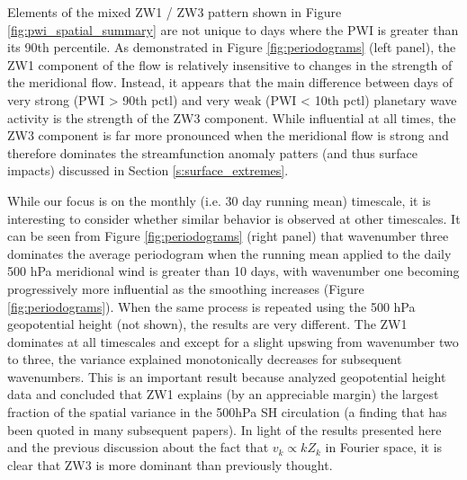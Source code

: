 Elements of the mixed ZW1 / ZW3 pattern shown in Figure \ref{fig:pwi_spatial_summary} are not unique to days where the PWI is greater than its 90th percentile. As demonstrated in Figure \ref{fig:periodograms} (left panel), the ZW1 component of the flow is relatively insensitive to changes in the strength of the meridional flow. Instead, it appears that the main difference between days of very strong (PWI > 90th pctl) and very weak (PWI < 10th pctl) planetary wave activity is the strength of the ZW3 component. While influential at all times, the ZW3 component is far more pronounced when the meridional flow is strong and therefore dominates the streamfunction anomaly patters (and thus surface impacts) discussed in Section \ref{s:surface_extremes}.

While our focus is on the monthly (i.e. 30 day running mean) timescale, it is interesting to consider whether similar behavior is observed at other timescales. It can be seen from Figure \ref{fig:periodograms} (right panel) that wavenumber three dominates the average periodogram when the running mean applied to the daily 500 hPa meridional wind is greater than 10 days, with wavenumber one becoming progressively more influential as the smoothing increases (Figure \ref{fig:periodograms}). When the same process is repeated using the 500 hPa geopotential height (not shown), the results are very different. The ZW1 dominates at all timescales and except for a slight upswing from wavenumber two to three, the variance explained monotonically decreases for subsequent wavenumbers. This is an important result because \citet{vanLoon1972} analyzed geopotential height data and concluded that ZW1 explains (by an appreciable margin) the largest fraction of the spatial variance in the 500hPa SH circulation (a finding that has been quoted in many subsequent papers). In light of the results presented here and the previous discussion about the fact that $v_k \propto k Z_k$ in Fourier space, it is clear that ZW3 is more dominant than previously thought. 